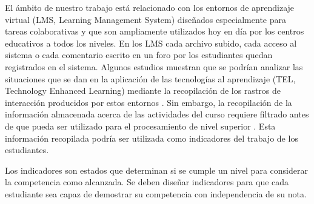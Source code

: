 El ámbito de nuestro trabajo está relacionado con los entornos de aprendizaje virtual (LMS, Learning Management System) diseñados especialmente para tareas colaborativas y que son ampliamente utilizados hoy en día por los centros educativos a todos los niveles. En los LMS cada archivo subido, cada acceso al sistema o cada comentario escrito en un foro por los estudiantes quedan registrados en el sistema. Algunos estudios muestran que se podrían analizar las situaciones que se dan en la aplicación de las tecnologías al aprendizaje (TEL, Technology Enhanced Learning) mediante la recopilación de los rastros de interacción producidos por estos entornos \cite{Chebil:2012}. Sin embargo, la recopilación de la información almacenada acerca de las actividades del curso requiere filtrado antes de que pueda ser utilizado para el procesamiento de nivel superior \cite{Florian:2011}. Esta información recopilada podría ser utilizada como indicadores del trabajo de los estudiantes.

Los indicadores son estados que determinan si se cumple un nivel para considerar la competencia como alcanzada. Se deben diseñar indicadores para que cada estudiante sea capaz de demostrar su competencia con independencia de su nota. 
